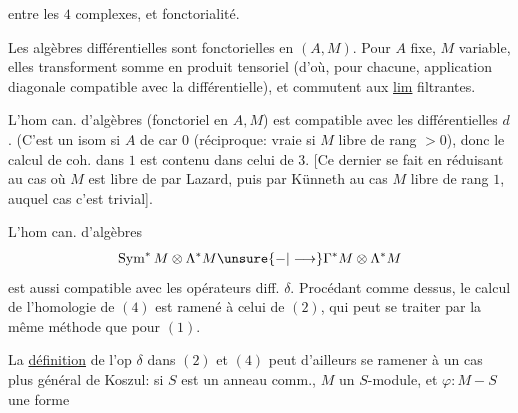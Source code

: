  entre les $4$ complexes, et fonctorialité.

Les  algèbres différentielles sont fonctorielles en $(A,M)$. Pour $A$ fixe, $M$ variable, elles transforment somme en produit tensoriel (d'où, pour chacune, application diagonale compatible avec  la différentielle), et commutent aux \uline{lim} filtrantes.

L'hom can. d'algèbres (fonctoriel en $A,M$)
est compatible avec les différentielles $d$. (C'est un isom  si $A$ de car $0$ (réciproque: vraie si  $M$ libre de rang $>0$), donc le calcul de coh. dans $1$ est contenu dans celui de $3$. [Ce dernier se fait en réduisant au cas où $M$ est libre de  par Lazard, puis par Künneth au cas $M$ libre de rang $1$, auquel cas c'est trivial].

L'hom can. d'algèbres
\[
\operatorname{Sym}^*M\otimes\Lambda^*M\unsure{-|\longrightarrow}\Gamma^*M\otimes\Lambda^*M
\]
est aussi compatible avec les opérateurs diff. $\delta$.    Procédant comme dessus, le calcul de l'homologie de $(4)$ est ramené à celui de $(2)$, qui peut se traiter par la même méthode que pour $(1)$.

La \uline{définition} de l'op $\delta$ dans $(2)$ et $(4)$ peut d'ailleurs se ramener à un cas plus général de Koszul: si $S$ est un anneau comm., $M$ un $S$-module,  et $\varphi:M-S$ une forme
